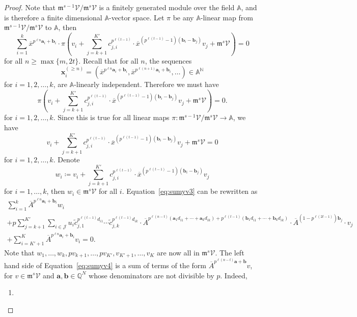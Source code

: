 \documentclass[letterpaper, 11pt, thm-restate]{article}
\numberwithin{equation}{section}
\newcommand{\N}{\mathbb{N}}
\newcommand{\Q}{\mathbb{Q}}
\newcommand{\A}{\mathbb{A}}
\newcommand{\mV}{\mathcal{V}}
\newcommand{\mJ}{\mathcal{J}}
\newcommand{\ba}{\boldsymbol{a}}
\newcommand{\bb}{\boldsymbol{b}}
\newcommand{\bx}{\boldsymbol{x}}
\newcommand{\tc}{\widetilde{c}}
\newcommand{\ox}{\overline{x}}
\newcommand{\oA}{\overline{A}}
\newcommand{\frm}{\mathfrak{m}}
\theoremstyle{definition}
\theoremstyle{definition}
\theoremstyle{definition}
\begin{document}
\begin{proof}
    Note that $\frm^{s-1} \mV/\frm^s\mV$ is a finitely generated module over the field $\A$, and is therefore a finite dimensional $\A$-vector space.
    Let $\pi$ be any $\A$-linear map from $\frm^{s-1} \mV/\frm^s\mV$ to $\A$, then
    \[
    \sum_{i = 1}^k \ox^{p^{\ell n} \ba_i + \bb_i} \cdot \pi \left(v_i + \sum_{j = k+1}^{K'} c_{j,i}^{p^{\ell (t-1)}} \cdot \ox^{(p^{\ell (t-1)} - 1) (\bb_i - \bb_j)} v_j + \frm^s\mV \right) = 0
    \]
    for all $n \geq \max\{m, 2t\}$.
    Recall that for all $n$, the sequences
    \[
    \bx_i^{(\geq n)} = \left(\ox^{p^{\ell n} \ba_i + \bb_i}, \ox^{p^{\ell (n+1)} \ba_i + \bb_i}, \ldots\right) \in \A^{\N}
    \]
    for $i = 1, 2, \ldots, k$, are $\A$-linearly independent.
    Therefore we must have
    \[
    \pi \left(v_i + \sum_{j = k+1}^{K'} c_{j,i}^{p^{\ell (t-1)}} \cdot \ox^{(p^{\ell (t-1)} - 1) (\bb_i - \bb_j)} v_j + \frm^s\mV \right) = 0.
    \]
    for $i = 1, 2, \ldots, k$. 
    Since this is true for all linear maps $\pi \colon \frm^{s-1} \mV/\frm^s\mV \rightarrow \A$, we have
    \[
    v_i + \sum_{j = k+1}^{K'} c_{j,i}^{p^{\ell (t-1)}} \cdot \ox^{(p^{\ell (t-1)} - 1) (\bb_i - \bb_j)} v_j + \frm^s\mV = 0
    \]
    for $i = 1, 2, \ldots, k$.
    Denote
    \[
    w_i \coloneqq v_i + \sum_{j = k+1}^{K'} c_{j,i}^{p^{\ell (t-1)}} \cdot \ox^{(p^{\ell (t-1)} - 1) (\bb_i - \bb_j)} v_j
    \]
    for $i = 1, \ldots, k$, then $w_i \in \frm^s\mV$ for all $i$.
    Equation~\eqref{eq:sumyv3} can be rewritten as
    \begin{multline}\label{eq:sumyv4}
    \sum_{i = 1}^k \oA^{p^{\ell n} \ba_i + \bb_i} w_i \\
        + p \sum_{j = k+1}^{K'} \sum_{i \in \mJ} u_{i} \tc_{j,1}^{p^{\ell (t-1)}d_{i1}} \cdots \tc_{j,k}^{p^{\ell (t-1)} d_{ik}} \cdot \oA^{p^{\ell (n-t)}(\ba_1 d_{i1} + \cdots + \ba_k d_{ik}) + p^{\ell (t-1)} (\bb_1 d_{i1} + \cdots + \bb_k d_{ik})} \cdot \oA^{(1 - p^{\ell (2t-1)}) \bb_j} \cdot v_j \\
        + \sum_{i = K'+1}^K \oA^{p^{\ell n} \ba_i + \bb_i} v_i = 0.
    \end{multline}
    Note that $w_1, \ldots, w_k, pv_{k+1}, \ldots, pv_{K'}, v_{K'+1}, \ldots, v_{K}$ are now all in $\frm^s \mV$.
    The left hand side of Equation~\eqref{eq:sumyv4} is a sum of terms of the form
    $
        \oA^{p^{\ell (n-t)} \ba + \bb} v
    $,
    for $v \in \frm^s \mV$ and $\ba, \bb \in \Q^{N}$ whose denominators are not divisible by $p$.
    Indeed,
    \begin{enumerate}[nosep, label=(\roman*)]
    \item 

\end{enumerate}
\end{proof}
\end{document}
